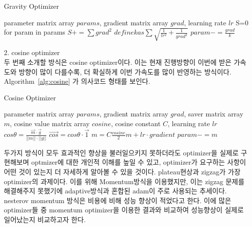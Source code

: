 \documentclass{article}
\begin{document}
\begin{algorithm}[tb]
   \caption{Gravity Optimizer}
   \label{alg:gravity}
\begin{algorithmic}
    parameter matrix array $params$, gradient matrix array $grad$, learning rate $lr$
   \STATE S=0
   \REPEAT
   \STATE for param in params
   \STATE $ S += \sum{grad^2}$
   \ENDFOR
   \STATE $define k as \sum{\sqrt{\frac{1}{lr^2}+\frac{1}{grad^2}}}$
   \STATE $param-=\frac{grad}{k}$
   \ENDFOR
\end{algorithmic}
\end{algorithm}

2. cosine optimizer\\
두 번째 소개할 방식은 cosine optimizer이다. 이는 현재 진행방향이 이번에 받은 가속도와 방향이 많이 다를수록, 더 확실하게 이번 가속도를 많이 반영하는 방식이다. Algorithm~\ref{alg:cosine} 가 의사코드 형태를 보인다.

\begin{algorithm}[tb]
   \caption{Cosine Optimizer}
   \label{alg:cosine}
\begin{algorithmic}
    parameter matrix array $params$, gradient matrix array $grad$, saver matrix array $m$, cosine value matrix array $cosine$, cosine constant $C$, learning rate $lr$
   \REPEAT
   \STATE $cos\theta=\frac{\vec{m}\cdot\vec{g}}{||m||\cdot||g||}$
   \STATE $\vec{cos}=cos\theta\cdot\vec{1}$
   \ENDFOR
   \STATE $m=C \frac{cosine}{2}m+lr\cdot gradient$
   \STATE $param-=m$
   \ENDFOR
\end{algorithmic}
\end{algorithm}


두가지 방식이 모두 효과적인 향상을 불러일으키지 못하더라도 optimizer을 실제로 구현해보며 optmizer에 대한 개인적 이해를 높일 수 있고, optimizer가 요구하는 사항이 어떤 것이 있는지 더 자세하게 알아볼 수 있을 것이다.
plateau현상과 zigzag가 가장 optimizer의 과제이다. 이를 위해 Momentum방식을 이용했지만, 이는 zigzag 문제를 해결해주지 못했기에 adaptive방식과 혼합된 adam이 주로 사용되는 추세이다. nesterov momentum 방식은 비용에 비해 성능 향상이 적었다고 한다. 이에 많은 optimizer들 중 momentum optimizer을 이용한 결과와 비교하여 성능향상이 실제로 일어났는지 비교하고자 한다.
\end{document}
